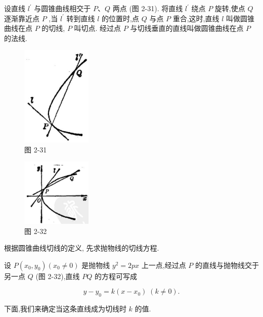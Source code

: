 \documentclass[lang=cn,newtx,10.5pt,scheme=chinese]{elegantbook}
\begin{document}
\begin{definition}[切线和法线] 
设直线 \({l}^{\prime }\) 与圆锥曲线相交于 \(P\text{、}Q\) 两点 (图 2-31). 将直线 \({l}^{\prime }\) 绕点 \(P\) 旋转,使点 \(Q\) 逐渐靠近点 \(P\) ,当 \({l}^{\prime }\) 转到直线 \(l\) 的位置时,点 \(Q\) 与点 \(P\) 重合,这时,直线 \(l\) 叫做圆锥曲线在点 \(P\) 的切线, \(P\) 叫切点. 经过点 \(P\) 与切线垂直的直线叫做圆锥曲线在点 \(P\) 的法线.
\end{definition}
\begin{figure}[h]
  \centering
  \includegraphics[max width=0.3\textwidth]{images/01912cc2-ffb6-728e-9ae7-b113ff05c64b_117_209153.jpg}
  \caption{图 2-31}
\end{figure}



\begin{figure}[h]
  \centering
  \includegraphics[max width=0.3\textwidth]{images/01912cc2-ffb6-728e-9ae7-b113ff05c64b_117_627681.jpg}
  \caption{图 2-32}
\end{figure}



根据圆锥曲线切线的定义, 先求抛物线的切线方程.

设 \(P\left( {{x}_{0},{y}_{0}}\right) \left( {{x}_{0} \neq 0}\right)\) 是抛物线 \({y}^{2} = {2px}\) 上一点,经过点 \(P\) 的直线与抛物线交于另一点 \(Q\) (图 2-32),直线 \({PQ}\) 的方程可写成

\[
  y - {y}_{0} = k\left( {x - {x}_{0}}\right) \;\left( {k \neq 0}\right) .
\]

下面,我们来确定当这条直线成为切线时 \(k\) 的值.
\end{document}
